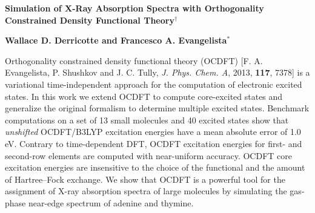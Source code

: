 \documentclass[12pt]{article}
\begin{document}
\noindent\LARGE{\textbf{Simulation of X-Ray Absorption Spectra with Orthogonality Constrained Density Functional Theory$^\dag$
}} 
\vspace{0.6cm}

\noindent\large{\textbf{Wallace D. Derricotte and Francesco A. Evangelista$^{\ast}$}}\vspace{0.5cm}

%
\vspace{0.6cm}

\noindent \normalsize{Orthogonality constrained density functional theory (OCDFT) [F. A. Evangelista, P. Shushkov and J. C. Tully, \textit{J. Phys. Chem. A}, 2013, {\bf{117}}, 7378] is a variational time-independent approach for the computation of electronic excited states.
In this work we extend OCDFT  to compute core-excited states and generalize the original formalism to determine multiple excited states.
Benchmark computations on a set of 13 small molecules and 40 excited states show that \textit{unshifted} OCDFT/B3LYP excitation energies have a mean absolute error of 1.0 eV.
Contrary to time-dependent DFT, OCDFT excitation energies for first- and second-row elements are computed with near-uniform accuracy.
OCDFT core excitation energies are insensitive to the choice of the functional and the amount of Hartree--Fock exchange.
We show that OCDFT is a powerful tool for the assignment of X-ray absorption spectra of large molecules by simulating the gas-phase near-edge spectrum of adenine and thymine.}

\vspace{0.5cm}
\doublespacing
\newpage
\end{document}
